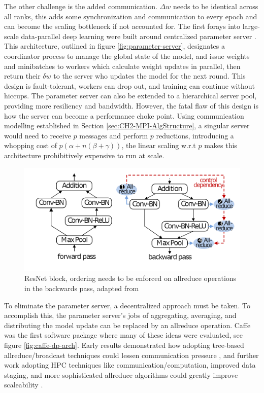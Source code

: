 The other challenge is the added communication.
$\Delta w$ needs to be identical across all ranks, this adds some synchronization and communication to every epoch and can become the scaling bottleneck if not accounted for.
The first forays into large-scale data-parallel deep learning were built around centralized parameter server \cite{Dean2012DistBelif, Chilimbi2014ProjectAdam}.
This architecture, outlined in figure \ref{fig:parameter-server}, designates a coordinator process to manage the global state of the model, and issue weights and minibatches to workers which calculate weight updates in parallel, then return their $\delta w$ to the server who updates the model for the next round.
This design is fault-tolerant, workers can drop out, and training can continue without hiccups. 
The parameter server can also be extended to a hierarchical server pool, providing more resiliency and bandwidth. 
However, the fatal flaw of this design is how the server can become a performance choke point.
Using communication modelling established in Section \ref{sec:CH2-MPI-AlgStructure}, a singular server would need to receive $p$ messages and perform $p$ reductions, introducing a whopping cost of $p(\alpha+n(\beta+\gamma))$, the linear scaling w.r.t $p$ makes this architecture prohibitively expensive to run at scale.

\begin{figure}
    \centering
    \includegraphics[width=15cm]{3_Chapters/3_Chapter_DistributedDL/Figs/ResNet_block_control_dependency.png}
    \caption{ResNet block, ordering needs to be enforced on allreduce operations in the backwards pass, adapted from \cite{Li2020DLPartialColl}}
    \label{fig:ResNet-controll-dependency}
\end{figure}

To eliminate the parameter server, a decentralized approach must be taken.
To accomplish this, the parameter server's jobs of aggregating, averaging, and distributing the model update can be replaced by an allreduce operation.
Caffe was the first software package where many of these ideas were evaluated, see figure \ref{fig:caffe-dp-arch}.
Early results demonstrated how adopting tree-based allreduce/broadcast techniques could lessen communication pressure \cite{Iandola2016FireCaffe}, and further work adopting HPC techniques like communication/computation, improved data staging, and more sophisticated allreduce algorithms could greatly improve scaleability \cite{Awan2017SCaffe}.

